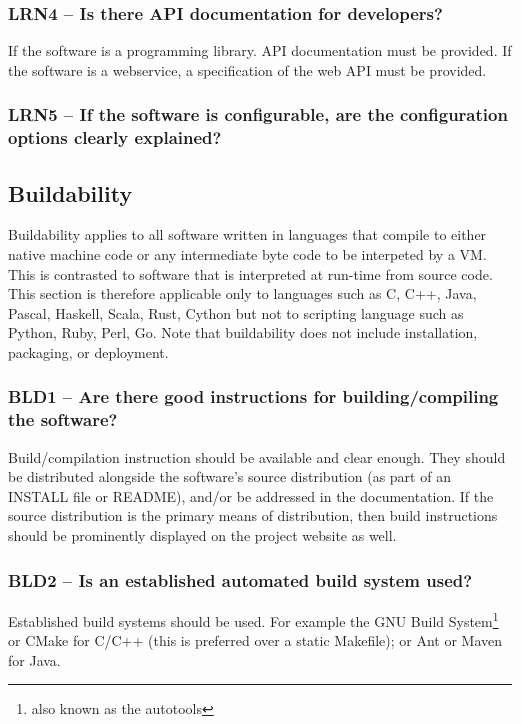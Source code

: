 \documentclass[a4paper,11pt]{article}
\begin{document}
\subsubsection{LRN4 -- Is there API documentation for developers?}

If the software is a programming library. API documentation must be provided.
If the software is a webservice, a specification of the web API must be provided.

\subsubsection{LRN5 -- If the software is configurable, are the configuration
options clearly explained?}


\subsection{Buildability}

Buildability applies to all software written in languages that compile to
either native machine code or any intermediate byte code to be interpeted by a VM.
This is contrasted to software that is interpreted at run-time from source
code. This section is therefore applicable only to languages such as C, C++,
Java, Pascal, Haskell, Scala, Rust, Cython but not to scripting language such
as Python, Ruby, Perl, Go.  Note that buildability does not include
installation, packaging, or deployment.

\subsubsection{BLD1 -- Are there good instructions for building/compiling the software?}

Build/compilation instruction should be available and clear enough. They should
be distributed alongside the software's source distribution (as part of an
INSTALL file or README), and/or be addressed in the documentation. If the
source distribution is the primary means of distribution, then build
instructions should be prominently displayed on the project website as well.

\subsubsection{BLD2 -- Is an established automated build system used?}

Established build systems should be used. For example the GNU Build
System\footnote{also known as the autotools} or CMake for C/C++ (this is
preferred over a static Makefile); or Ant or Maven for Java. 
\end{document}
